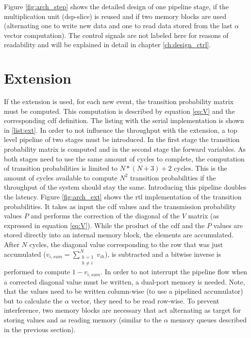 \documentclass[mscthesis]{usiinfthesis}
\begin{document}
Figure \ref{fig:arch_step} shows the detailed design of one pipeline stage, if
the multiplication unit (\gls{dsp}-slice) is reused and if two memory blocks
are used (alternating one to write new data and one to read data stored from
the last $\alpha$ vector computation). The control signals are not labeled here
for reasons of readability and will be explained in detail in chapter
\ref{ch:design_ctrl}.

\section{Extension}
\label{ch:design_ext}

If the extension is used, for each new event, the transition probability matrix
must be computed. This computation is described by equation \ref{eq:V} and the
corresponding \gls{cdf} definition. The listing with the serial implementation
is shown in \ref{list:ext}. In order to not influence the throughput with the
extension, a top level pipeline of two stages must be introduced. In the first
stage the transition probability matrix is computed and in the second stage the
forward variables. As both stages need to use the same amount of cycles to
complete, the computation of transition probabilities is limited to $N*(N+3)+2$
cycles. This is the amount of cycles available to compute $N^2$ transition
probabilities if the throughput of the system should stay the same. Introducing
this pipeline doubles the latency. Figure \ref{fig:arch_ext} shows the
\gls{rtl} implementation of the transition probabilities. It takes as input the
\gls{cdf} values and the transmission probability values $P$ and performs the
correction of the diagonal of the $V$ matrix (as expressed in equation
\ref{eq:V}). While the product of the \gls{cdf} and the $P$ values are stored
directly into an internal memory block, the elements are accumulated. After $N$
cycles, the diagonal value corresponding to the row that was just accumulated
($v_{i, sum} = \sum\limits_{\substack{h=1 \\ h \neq i}}^{N} v_{ih}$), is
subtracted and a bitwise inverse is performed to compute $1 - v_{i, sum}$. In
order to not interrupt the pipeline flow when a corrected diagonal value must
be written, a dual-port memory is needed. Note, that the values need to be
written column-wise (to use a pipelined accumulator) but to calculate the
$\alpha$ vector, they need to be read row-wise. To prevent interference, two
memory blocks are necessary that act alternating as target for storing values
and as reading memory (similar to the $\alpha$ memory queues described in the
previous section).
\end{document}
